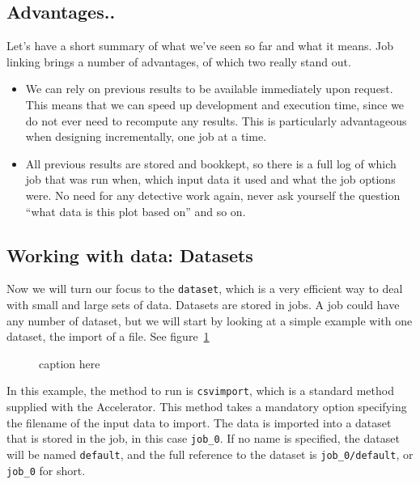 \documentclass[a4paper]{article}
\begin{document}
\subsection{Advantages..}
Let's have a short summary of what we've seen so far and what it
means.  Job linking brings a number of advantages, of which two really
stand out.
\begin{itemize}
\item[] We can rely on previous results to be available immediately
  upon request.  This means that we can speed up development and
  execution time, since we do not ever need to recompute any results.
  This is particularly advantageous when designing incrementally, one
  job at a time.
\item[] All previous results are stored and bookkept, so there is a
  full log of which job that was run when, which input data it used
  and what the job options were.  No need for any detective work
  again, never ask yourself the question ``what data is this plot
  based on'' and so on.
\end{itemize}

\subsection{Working with data: Datasets}
Now we will turn our focus to the \texttt{dataset}, which is a very
efficient way to deal with small and large sets of data.  Datasets are
stored in jobs.  A job could have any number of dataset, but we will
start by looking at a simple example with one dataset, the import of a
file.  See figure~\ref{fig:dataset_csvimport}

\begin{figure}[h!]
  \begin{center}
    
    \caption{caption here}
    \label{fig:dataset_csvimport}
  \end{center}
\end{figure}

\noindent In this example, the method to run is \texttt{csvimport},
which is a standard method supplied with the Accelerator.  This method
takes a mandatory option specifying the filename of the input data to
import.  The data is imported into a dataset that is stored in the
job, in this case \texttt{job\_0}.  If no name is specified, the
dataset will be named \texttt{default}, and the full reference to the
dataset is \texttt{job\_0/default}, or \texttt{job\_0} for short.
\end{document}
